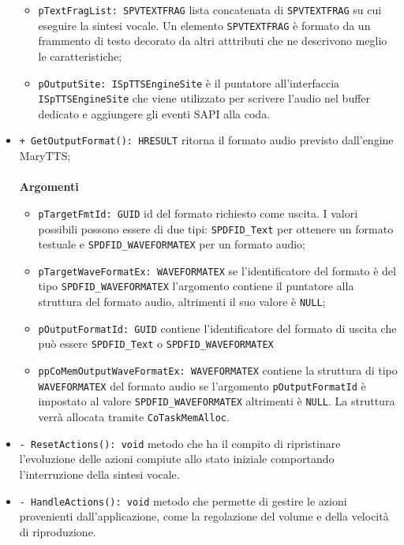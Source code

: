 \begin{itemize}
\begin{itemize}
		\item \texttt{pTextFragList: SPVTEXTFRAG} lista concatenata di \texttt{SPVTEXTFRAG} su cui eseguire la sintesi vocale. Un elemento \texttt{SPVTEXTFRAG} è formato da un frammento di testo decorato da altri atttributi che ne descrivono meglio le caratteristiche;
		\item \texttt{pOutputSite: ISpTTSEngineSite} è il puntatore all'interfaccia\\\texttt{ISpTTSEngineSite} che viene utilizzato per scrivere l'audio nel buffer dedicato e aggiungere gli eventi SAPI alla coda.
	\end{itemize}
	\item \texttt{+ GetOutputFormat(): HRESULT} ritorna il formato audio previsto dall'engine MaryTTS;
	\\\\
	\textbf{Argomenti}
	\begin{itemize}
		\item \texttt{pTargetFmtId: GUID} id del formato richiesto come uscita. I valori possibili possono essere di due tipi: \texttt{SPDFID\_Text} per ottenere un formato testuale e \texttt{SPDFID\_WAVEFORMATEX} per un formato audio;
		\item \texttt{pTargetWaveFormatEx: WAVEFORMATEX} se l'identificatore del formato è del tipo \texttt{SPDFID\_WAVEFORMATEX} l'argomento contiene il puntatore alla struttura del formato audio, altrimenti il suo valore è \texttt{NULL};
		\item \texttt{pOutputFormatId: GUID} contiene l'identificatore del formato di uscita che può essere \texttt{SPDFID\_Text} o \texttt{SPDFID\_WAVEFORMATEX}
		\item \texttt{ppCoMemOutputWaveFormatEx: WAVEFORMATEX} contiene la struttura di tipo \texttt{WAVEFORMATEX} del formato audio se l'argomento \texttt{pOutputFormatId} è impostato al valore \texttt{SPDFID\_WAVEFORMATEX} altrimenti è \texttt{NULL}. La struttura verrà allocata tramite \texttt{CoTaskMemAlloc}.
	\end{itemize}
	\item \texttt{- ResetActions(): void} metodo che ha il compito di ripristinare l'evoluzione delle azioni compiute allo stato iniziale comportando l'interruzione della sintesi vocale.
	\item \texttt{- HandleActions(): void} metodo che permette di gestire le azioni provenienti dall'applicazione, come la regolazione del volume e della velocità di riproduzione.
	\\\\

\end{itemize}
